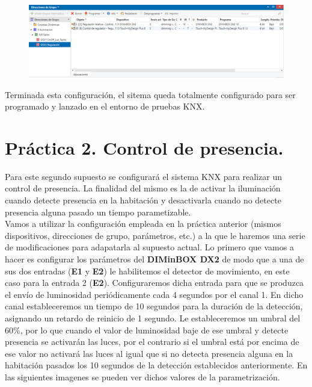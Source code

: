 \documentclass[10pt]{article}
\begin{document}
\begin{figure}[H]
	\begin{center}
	 		\includegraphics[width = 1.00\textwidth]{Imagenes/img12}
	\end{center} 
\end{figure}

Terminada esta configuración, el sitema queda totalmente configurado para ser programado y lanzado en el entorno de pruebas KNX. \\


\section{Práctica 2. Control de presencia.} 
Para este segundo supuesto se configurará el sistema KNX para realizar un control de presencia. La finalidad del mismo es la de activar la iluminación cuando detecte presencia en la habitación y desactivarla cuando no detecte presencia alguna pasado un tiempo parametizable. \\

Vamos a utilizar la configuración empleada en la práctica anterior (mismos dispositivos, direcciones de grupo, parámetros, etc.) a la que le haremos una serie de modificaciones para adapatarla al supuesto actual. Lo primero que vamos a hacer es configurar los parámetros del \textbf{DIMinBOX DX2} de modo que a una de sus dos entradas (\textbf{E1} y \textbf{E2}) le habilitemos el detector de movimiento, en este caso para la entrada 2 (\textbf{E2}). Configuraremos dicha entrada para que se produzca el envío de luminosidad periódicamente cada 4 segundos por el canal 1. En dicho canal estableceremos un tiempo de 10 segundos para la duración de la detección, asignando un retardo de reinicio de 1 segundo. Le estableceremos un umbral del 60\%, por lo que cuando el valor de luminosidad baje de ese umbral y detecte presencia se activarán las luces, por el contrario si el umbral está por encima de ese valor no activará las luces al igual que si no detecta presencia alguna en la habitación pasados los 10 segundos de la detección establecidos anteriormente. En las siguientes imagenes se pueden ver dichos valores de la parametrización. \\
\end{document}
